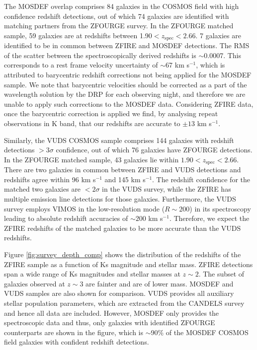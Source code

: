 \documentclass[iop]{emulateapj}
\newcommand{\around}{$\sim$}
\newcommand{\zspec}{$z_{\mathrm{spec}}$}
\begin{document}
The MOSDEF overlap comprises  84 galaxies in the COSMOS field with high confidence redshift detections, out of which 74 galaxies are identified with matching partners from the ZFOURGE survey. In the ZFOURGE matched sample, 59 galaxies are at redshifts between 1.90$<$\zspec$<2.66$. 
7 galaxies are identified to be in common between ZFIRE and MOSDEF detections. 
The RMS of the scatter between the spectroscopically derived redshifts is \around0.0007.
This corresponds to a rest frame velocity uncertainty of  \around67 km s$^{-1}$, which is attributed to barycentric redshift corrections not being applied for the MOSDEF sample. 
We note that barycentric velocities should be corrected as a part of the wavelength solution by the DRP for each observing night, and therefore we are unable to apply such corrections to the MOSDEF data. Considering ZFIRE data, once the barycentric correction is applied we find, by analysing repeat observations in K band, that our redshifts are accurate to $\pm13$ km s$^{-1}$.


Similarly, the VUDS COSMOS sample comprises 144 galaxies with redshift detections $>3\sigma$ confidence, out of which 76 galaxies have ZFOURGE detections. In the ZFOURGE matched sample, 43 galaxies lie within $1.90<$\zspec$<2.66$. 
There are two galaxies in common between ZFIRE and VUDS detections and redshifts agree within 96 km s$^{-1}$ and 145 km s$^{-1}$. The redshift confidence for the matched two galaxies are $<\mathrm{2}\sigma$ in the VUDS survey, while the ZFIRE has multiple emission line detections for those galaxies.  Furthermore, the VUDS survey employs VIMOS in the low-resolution mode ($R\sim200$) in its spectroscopy leading to absolute redshift accuracies of $\sim200$ km s$^{-1}$. Therefore, we expect the ZFIRE redshifts of the matched galaxies to be more accurate than the VUDS redshifts. 

 
Figure \ref{fig:survey_depth_comp} shows the distribution of the redshifts of the ZFIRE sample as a function of Ks magnitude and stellar mass. ZFIRE detections span a wide range of Ks magnitudes and stellar masses at $z\sim2$. The subset of galaxies observed at $z\sim3$ are fainter and are of lower mass. MOSDEF and VUDS samples are also shown for comparison. VUDS provides all auxiliary stellar population parameters, which are extracted from the CANDELS survey and hence all data are included. However, MOSDEF only provides the spectroscopic data and thus, only galaxies with identified ZFOURGE counterparts are shown in the figure, which is $\sim$90\% of the MOSDEF COSMOS field galaxies  with confident redshift detections. 
\end{document}
